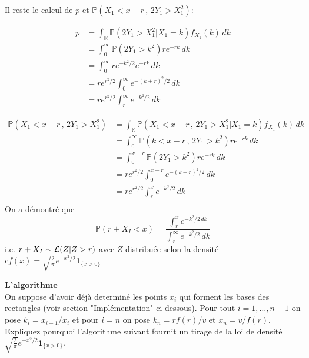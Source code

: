 \documentclass[a4paper]{article}
\begin{document}
\begin{enumerate}[(a)]
Il reste le calcul de $p$ et $\mathbb{P}(X_1<x-r\,,\,2Y_1>X_1^2)$:

\begin{align*}
p &= \int_{\mathbb{R}}\mathbb{P}(2Y_1 > X_1^2|X_1=k)f_{X_1}(k)\,dk\\
&= \int_0^{\infty}\mathbb{P}(2Y_1 > k^2)re^{-rk}\,dk\\
&= \int_0^{\infty}re^{-k^2/2}e^{-rk}\,dk\\
&= re^{r^2/2}\int_0^{\infty}e^{-(k+r)^2/2}\,dk\\
&= re^{r^2/2}\int_r^{\infty}e^{-k^2/2}\,dk
\end{align*}

\begin{align*}
\mathbb{P}(X_1<x-r\,,\,2Y_1>X_1^2) &= \int_{\mathbb{R}}\mathbb{P}(X_1<x-r\,,\,2Y_1>X_1^2|X_1=k)f_{X_1}(k)\,dk\\
&= \int_0^{\infty}\mathbb{P}(k<x-r\,,\,2Y_1>k^2)re^{-rk}\,dk\\
&= \int_0^{x-r}\mathbb{P}(2Y_1>k^2)re^{-rk}\,dk\\
&= re^{r^2/2}\int_0^{x-r}e^{-(k+r)^2/2}\,dk\\
&= re^{r^2/2}\int_r^xe^{-k^2/2}\,dk\\
\end{align*}
On a d\'emontr\'e que $$\mathbb{P}(r+X_I<x) = \displaystyle\frac{\displaystyle\int_r^xe^{-k^2/2\,dk}}{\displaystyle\int_r^{\infty}e^{-k^2/2}\,dk}$$
i.e. $r+X_I\sim {\cal L}(Z|Z>r)$ avec $Z$ distribu\'ee selon la densit\'e $cf(x) = \sqrt{\frac{2}{\pi}}e^{-x^2/2}\mathbf{1}_{\{x>0\}}$

\end{enumerate}

\textbf{L'algorithme}
\\On suppose d'avoir d\'ej\`a determin\'e les points $x_i$ qui forment les bases des rectangles (voir section "Impl\'ementation" ci-dessous). Pour tout $i=1,\ldots,n-1$ on pose $k_i = x_{i-1}/x_i$ et pour $i=n$ on pose $k_n = rf(r)/v$ et $x_n = v/f(r)$. Expliquez pourquoi l'algorithme suivant fournit un tirage de la loi de densit\'e $\sqrt{\frac{2}{\pi}}e^{-x^2/2}\mathbf{1}_{\{x>0\}}.$
\end{document}
